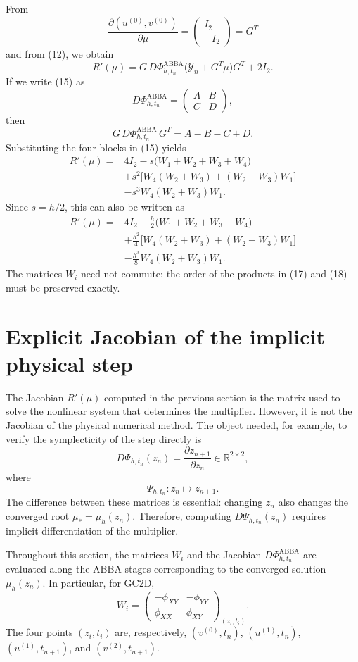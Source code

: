 \documentclass[11pt,a4paper]{article}
\newcommand{\R}{\mathbb{R}}
\newcommand{\Id}{I}
\newcommand{\Y}{\mathcal{Y}}
\newcommand{\PhiAB}{\Phi^{\mathrm{ABBA}}_{h,t_n}}
\begin{document}
From
\[
 \frac{\partial(u^{(0)},v^{(0)})}{\partial\mu}
 =\begin{pmatrix}\Id_2\\-\Id_2\end{pmatrix}=G^T
\]
and from (12), we obtain
\[
 \boxed{
 R'(\mu)=G\,D\PhiAB\bigl(\Y_n+G^T\mu\bigr)G^T+2\Id_2.
 } \tag{16}
\]
If we write (15) as
\[
 D\PhiAB=
 \begin{pmatrix}A&B\\C&D\end{pmatrix},
\]
then
\[
 G\,D\PhiAB\,G^T=A-B-C+D.
\]
Substituting the four blocks in (15) yields
\[
 \boxed{
 \begin{aligned}
 R'(\mu)={}&4\Id_2
 -s\bigl(W_1+W_2+W_3+W_4\bigr)\\
 &+s^2\bigl[W_4(W_2+W_3)+(W_2+W_3)W_1\bigr]\\
 &-s^3W_4(W_2+W_3)W_1.
 \end{aligned}
 } \tag{17}
\]
Since $s=h/2$, this can also be written as
\[
 \boxed{
 \begin{aligned}
 R'(\mu)={}&4\Id_2
 -\frac h2\bigl(W_1+W_2+W_3+W_4\bigr)\\
 &+\frac{h^2}{4}
 \bigl[W_4(W_2+W_3)+(W_2+W_3)W_1\bigr]\\
 &-\frac{h^3}{8}W_4(W_2+W_3)W_1.
 \end{aligned}
 } \tag{18}
\]
The matrices $W_i$ need not commute: the order of the products in (17) and (18) must be
preserved exactly.

\section{Explicit Jacobian of the implicit physical step}

The Jacobian $R'(\mu)$ computed in the previous section is the matrix used to solve the
nonlinear system that determines the multiplier. However, it is not the Jacobian of the
physical numerical method. The object needed, for example, to verify the symplecticity of
the step directly is
\[
 D\Psi_{h,t_n}(z_n)
 =\frac{\partial z_{n+1}}{\partial z_n}\in\R^{2\times2},
\]
where
\[
 \Psi_{h,t_n}:z_n\longmapsto z_{n+1}.
\]
The difference between these matrices is essential: changing $z_n$ also changes the
converged root $\mu_*=\mu_h(z_n)$. Therefore, computing $D\Psi_{h,t_n}(z_n)$ requires
implicit differentiation of the multiplier.

Throughout this section, the matrices $W_i$ and the Jacobian $D\PhiAB$ are evaluated along
the ABBA stages corresponding to the converged solution $\mu_h(z_n)$. In particular, for
GC2D,
\[
 W_i=
 \begin{pmatrix}
  -\phi_{XY}&-\phi_{YY}\\
  \phi_{XX}&\phi_{XY}
 \end{pmatrix}_{(z_i,t_i)}.
\]
The four points $(z_i,t_i)$ are, respectively,
$(v^{(0)},t_n)$, $(u^{(1)},t_n)$, $(u^{(1)},t_{n+1})$, and
$(v^{(2)},t_{n+1})$.
\end{document}
